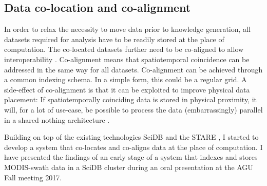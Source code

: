 \documentclass[a4paper,10pt]{article}
\begin{document}
\newpage

\subsection{Data co-location and co-alignment}
In order to relax the necessity to move data prior to knowledge generation, all datasets required for analysis have to be readily stored at the place of computation. 
The co-located datasets further need to be co-aligned to allow interoperability \citep{Kuo2017, Rilee2016}. 
Co-alignment means that spatiotemporal coincidence can be addressed in the same way for all datasets. 
Co-alignment can be achieved through a common indexing schema. 
In a simple form, this could be a regular grid. 
A side-effect of co-alignment is that it can be exploited to improve physical data placement: If spatiotemporally coinciding data is stored in physical proximity, it will, for a lot of use-case, be possible to process the data (embarrassingly) parallel in a shared-nothing architecture \citep{Kuo2017}.

Building on top of the existing technologies SciDB and the \gls{STARE} \citep{Kuo2017}, 
I started to develop a system that co-locates and co-aligns data at the place of computation. I have presented the findings of an early stage of a system that indexes and stores \gls{MODIS}-swath data in a SciDB cluster during an oral presentation at the AGU Fall meeting 2017.
\end{document}
